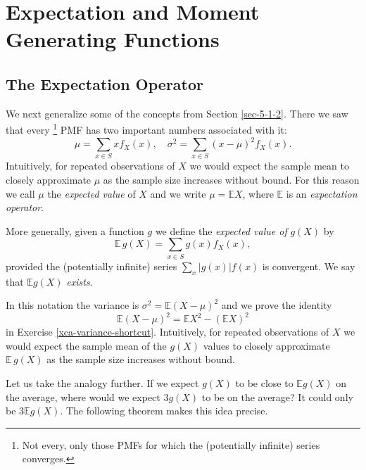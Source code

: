 \documentclass[captions=tableheading]{scrbook}
\begin{document}
\section{Expectation and Moment Generating Functions}
\label{sec-5-4}
\label{sec-expectation-and-mgfs}
\subsection{The Expectation Operator}
\label{sec-5-4-1}
\label{sub-expectation-operator}


We next generalize some of the concepts from Section \ref{sec-5-1-2}. There we saw that every
\footnote{Not every, only those PMFs for which the (potentially infinite) series converges.}
PMF has two important numbers associated with it:
\begin{equation}
\mu=\sum_{x\in S}xf_{X}(x),\quad \sigma^{2}=\sum_{x\in S}(x-\mu)^{2}f_{X}(x).
\end{equation}
Intuitively, for repeated observations of \(X\) we would expect the sample mean to closely approximate \(\mu\) as the sample size increases without bound. For this reason we call \(\mu\) the \emph{expected value} of \(X\) and we write \(\mu=\mathbb{E} X\), where \(\mathbb{E}\) is an \emph{expectation operator}.

\begin{defn}
More generally, given a function \(g\) we define the \emph{expected value of} \(g(X)\) by
\begin{equation}
\mathbb{E}\, g(X)=\sum_{x\in S}g(x)f_{X}(x),
\end{equation}
provided the (potentially infinite) series \(\sum_{x}|g(x)|f(x)\) is convergent. We say that \(\mathbb{E} g(X)\) \emph{exists}.
\end{defn}

In this notation the variance is \(\sigma^{2}=\mathbb{E}(X-\mu)^{2}\) and we prove the identity
\begin{equation}
\mathbb{E}(X-\mu)^{2}=\mathbb{E} X^{2}-(\mathbb{E} X)^{2}
\end{equation}
in Exercise \ref{xca-variance-shortcut}. Intuitively, for repeated observations of \(X\) we would expect the sample mean of the \(g(X)\) values to closely approximate \(\mathbb{E}\, g(X)\) as the sample size increases without bound.

Let us take the analogy further. If we expect \(g(X)\) to be close to \(\mathbb{E} g(X)\) on the average, where would we expect \(3g(X)\) to be on the average? It could only be \(3\mathbb{E} g(X)\). The following theorem makes this idea precise.
\end{document}
